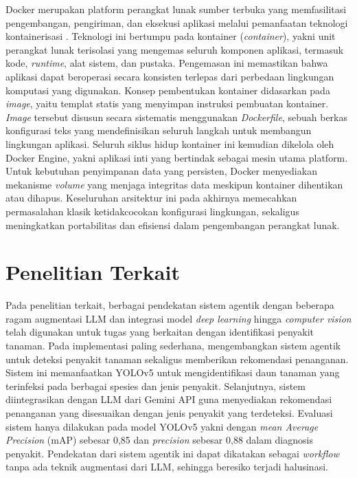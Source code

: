 Docker merupakan platform perangkat lunak sumber terbuka yang memfasilitasi pengembangan, pengiriman, dan eksekusi aplikasi melalui pemanfaatan teknologi kontainerisasi \parencite{stoneman2025docker}. Teknologi ini bertumpu pada kontainer (\textit{container}), yakni unit perangkat lunak terisolasi yang mengemas seluruh komponen aplikasi, termasuk kode, \textit{runtime}, alat sistem, dan pustaka. Pengemasan ini memastikan bahwa aplikasi dapat beroperasi secara konsisten terlepas dari perbedaan lingkungan komputasi yang digunakan. Konsep pembentukan kontainer didasarkan pada \textit{image}, yaitu templat statis yang menyimpan instruksi pembuatan kontainer. \textit{Image} tersebut disusun secara sistematis menggunakan \textit{Dockerfile}, sebuah berkas konfigurasi teks yang mendefinisikan seluruh langkah untuk membangun lingkungan aplikasi. Seluruh siklus hidup kontainer ini kemudian dikelola oleh Docker Engine, yakni aplikasi inti yang bertindak sebagai mesin utama platform. Untuk kebutuhan penyimpanan data yang persisten, Docker menyediakan mekanisme \textit{volume} yang menjaga integritas data meskipun kontainer dihentikan atau dihapus. Keseluruhan arsitektur ini pada akhirnya memecahkan permasalahan klasik ketidakcocokan konfigurasi lingkungan, sekaligus meningkatkan portabilitas dan efisiensi dalam pengembangan perangkat lunak.

\section{Penelitian Terkait}
Pada penelitian terkait, berbagai pendekatan sistem agentik dengan beberapa ragam augmentasi LLM dan integrasi model \textit{deep learning} hingga \textit{computer vision} telah digunakan untuk tugas yang berkaitan dengan identifikasi penyakit tanaman. Pada implementasi paling sederhana, \textcite{sbDesignImplementationAIPowered2024} mengembangkan sistem agentik untuk deteksi penyakit tanaman sekaligus memberikan rekomendasi penanganan. Sistem ini memanfaatkan YOLOv5 untuk mengidentifikasi daun tanaman yang terinfeksi pada berbagai spesies dan jenis penyakit. Selanjutnya, sistem diintegrasikan dengan LLM dari Gemini API guna menyediakan rekomendasi penanganan yang disesuaikan dengan jenis penyakit yang terdeteksi. Evaluasi sistem hanya dilakukan pada model YOLOv5 yakni dengan \textit{mean Average Precision} (mAP) sebesar 0,85 dan \textit{precision} sebesar 0,88 dalam diagnosis penyakit. Pendekatan dari sistem agentik ini dapat dikatakan sebagai \textit{workflow} tanpa ada teknik augmentasi dari LLM, sehingga beresiko terjadi halusinasi.

